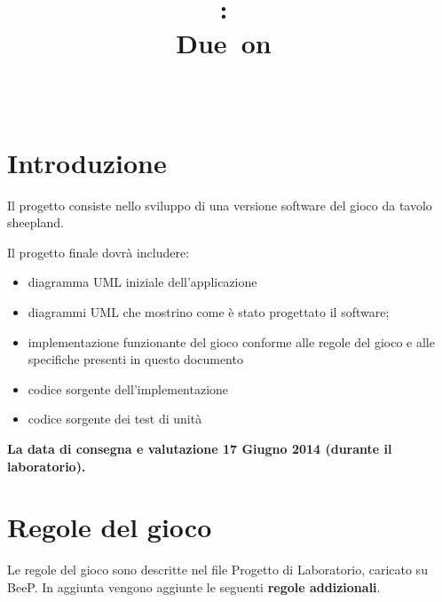 \documentclass{article}
\title{
\vspace{2in}
\textmd{\textbf{\hmwkClass:\ \hmwkTitle}}\\
\normalsize\vspace{0.1in}\small{Due\ on\ \hmwkDueDate}\\
\vspace{0.1in}\large{\textit{\hmwkClassInstructor\ \hmwkClassTime}}
\vspace{3in}
}
\author{\textbf{\hmwkAuthorName}}
\date{} %
\begin{document}
\maketitle



\newpage
\tableofcontents
\newpage



\section{Introduzione}
Il progetto consiste nello sviluppo di una versione software del gioco da tavolo sheepland.

Il progetto finale dovr\` a includere:
\begin{itemize}
\item diagramma UML iniziale dell'applicazione
\item diagrammi UML che mostrino come \` e stato progettato il software;
\item implementazione funzionante del gioco conforme alle regole del gioco e alle specifiche presenti in questo documento
\item codice sorgente dell'implementazione
\item codice sorgente dei test di unit\`a
\end{itemize}



\textbf{La data di consegna e valutazione 17 Giugno 2014 (durante il laboratorio).}

\section{Regole del gioco}
Le regole del gioco sono descritte nel file Progetto di Laboratorio, caricato su BeeP. In aggiunta vengono aggiunte le seguenti \textbf{regole addizionali}. 
\end{document}
